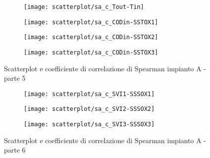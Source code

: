 \begin{sidewaysfigure}[h]\ContinuedFloat
	\renewcommand*\thesubfigure{(\arabic{subfigure})}
	\begin{subfigure}{0.49\textwidth}
		\texttt{[image: scatterplot/sa\_c\_Tout-Tin]}
		\caption{}
		\centering
	\end{subfigure}
	\begin{subfigure}{0.49\textwidth}
		\texttt{[image: scatterplot/sa\_c\_CODin-SSTOX1]}
		\caption{}
		\centering
	\end{subfigure}

	\begin{subfigure}{0.49\textwidth}
		\texttt{[image: scatterplot/sa\_c\_CODin-SSTOX2]}	
		\caption{}
		\centering
	\end{subfigure}
	\begin{subfigure}{0.49\textwidth}
		\texttt{[image: scatterplot/sa\_c\_CODin-SSTOX3]}
		\caption{}
		\centering
	\end{subfigure}
	\caption{Scatterplot e coefficiente di correlazione di Spearman impianto A - parte 5}
\end{sidewaysfigure}

\begin{sidewaysfigure}[h]\ContinuedFloat
	\renewcommand*\thesubfigure{(\arabic{subfigure})}
	\begin{subfigure}{0.49\textwidth}
		\texttt{[image: scatterplot/sa\_c\_SVI1-SSSOX1]}
		\caption{}
		\centering
	\end{subfigure}
	\begin{subfigure}{0.49\textwidth}
		\texttt{[image: scatterplot/sa\_c\_SVI2-SSSOX2]}
		\caption{}
		\centering
	\end{subfigure}

	\begin{subfigure}{0.49\textwidth}
		\texttt{[image: scatterplot/sa\_c\_SVI3-SSSOX3]}	
		\caption{}
		\centering
	\end{subfigure}
	\caption{Scatterplot e coefficiente di correlazione di Spearman impianto A - parte 6}
\end{sidewaysfigure}



